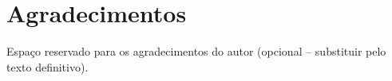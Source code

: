 %

\chapter*{Agradecimentos}

Espaço reservado para os agradecimentos do autor (opcional -- substituir pelo texto definitivo).
